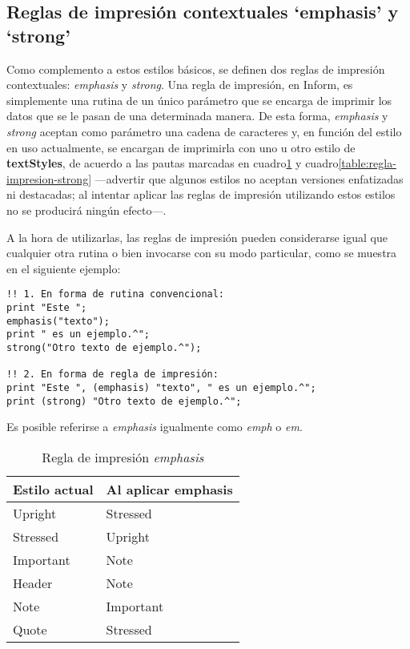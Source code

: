 \documentclass[a4paper,12pt]{article}
\numberwithin{equation}{section}
\begin{document}
\subsection{Reglas de impresión contextuales `emphasis' y `strong'} \label{sec:estilos-contextuales}

Como complemento a estos estilos básicos, se definen dos reglas de impresión contextuales: \emph{emphasis} y \emph{strong}. Una regla de impresión, en Inform, es simplemente una rutina de un único parámetro que se encarga de imprimir los datos que se le pasan de una determinada manera\cite{FIR06}. De esta forma, \emph{emphasis} y \emph{strong} aceptan como parámetro una cadena de caracteres y, en función del estilo en uso actualmente, se encargan de imprimirla con uno u otro estilo de \textbf{textStyles}, de acuerdo a las pautas marcadas en cuadro\ref{table:regla-impresion-emphasis} y cuadro\ref{table:regla-impresion-strong} ---advertir que algunos estilos no aceptan versiones enfatizadas ni destacadas; al intentar aplicar las reglas de impresión utilizando estos estilos no se producirá ningún efecto---.

A la hora de utilizarlas, las reglas de impresión pueden considerarse igual que cualquier otra rutina o bien invocarse con su modo particular, como se muestra en el siguiente ejemplo:

\begin{verbatim}
!! 1. En forma de rutina convencional:
print "Este ";
emphasis("texto");
print " es un ejemplo.^";
strong("Otro texto de ejemplo.^");

!! 2. En forma de regla de impresión:
print "Este ", (emphasis) "texto", " es un ejemplo.^";
print (strong) "Otro texto de ejemplo.^";
\end{verbatim}

Es posible referirse a \emph{emphasis} igualmente como \emph{emph} o \emph{em}.

\begin{table}[]
\centering
\begin{tabular}{ll}
\hline
\textbf{Estilo actual}	& \textbf{Al aplicar emphasis} \\ \hline
Upright					& Stressed						\\
Stressed				& Upright						\\
Important				& Note							\\
Header					& Note							\\
Note					& Important						\\
Quote					& Stressed						\\ \hline
\end{tabular}
\caption{Regla de impresión \emph{emphasis}}
\label{table:regla-impresion-emphasis}
\end{table}
\end{document}
